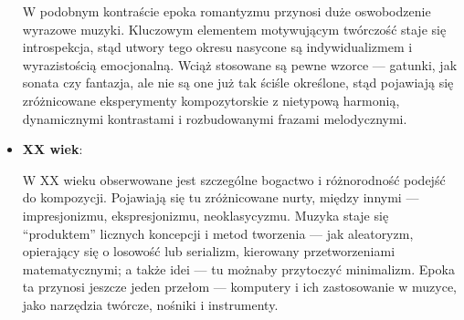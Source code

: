 \documentclass[12pt]{article}
\begin{document}
\begin{itemize}
	      W podobnym kontraście epoka romantyzmu przynosi duże oswobodzenie wyrazowe muzyki.
	      Kluczowym elementem motywującym twórczość staje się introspekcja, stąd utwory tego okresu nasycone są indywidualizmem
	      i wyrazistością emocjonalną.
	      Wciąż stosowane są pewne wzorce — gatunki, jak sonata czy fantazja, ale nie są one już tak ściśle określone,
	      stąd pojawiają się zróżnicowane eksperymenty kompozytorskie z nietypową harmonią, dynamicznymi kontrastami i rozbudowanymi
	      frazami melodycznymi.
	\item \textbf{XX wiek}:
	      
	      W XX wieku obserwowane jest szczególne bogactwo i różnorodność podejść do kompozycji.
	      Pojawiają się tu zróżnicowane nurty, między innymi — impresjonizmu, ekspresjonizmu, neoklasycyzmu.
	      Muzyka staje się \enquote{produktem} licznych koncepcji i metod tworzenia — jak aleatoryzm, opierający
	      się o losowość lub serializm, kierowany przetworzeniami matematycznymi; a także idei — tu możnaby przytoczyć minimalizm.
	      Epoka ta przynosi jeszcze jeden przełom — komputery i ich zastosowanie w muzyce, jako narzędzia twórcze, nośniki i instrumenty.
\end{itemize}
\end{document}
